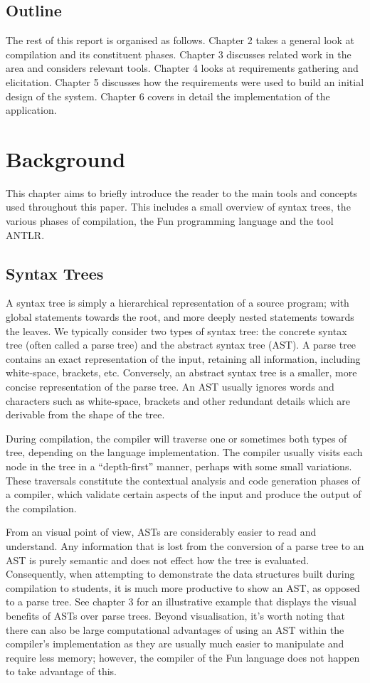 \documentclass{l4proj}
\begin{document}
\section{Outline}
The rest of this report is organised as follows. Chapter 2 takes a general look at compilation and its constituent phases. Chapter 3 discusses related work in the area and considers relevant tools. Chapter 4 looks at requirements gathering and elicitation. Chapter 5 discusses how the requirements were used to build an initial design of the system. Chapter 6 covers in detail the implementation of the application.

\chapter{Background}
This chapter aims to briefly introduce the reader to the main tools and concepts used throughout this paper. This includes a small overview of syntax trees, the various phases of compilation, the Fun programming language and the tool ANTLR.

\section{Syntax Trees}
A syntax tree is simply a hierarchical representation of a source program; with global statements towards the root, and more deeply nested statements towards the leaves. We typically consider two types of syntax tree: the concrete syntax tree (often called a parse tree) and the abstract syntax tree (AST). A parse tree contains an exact representation of the input, retaining all information, including white-space, brackets, etc. Conversely, an abstract syntax tree is a smaller, more concise representation of the parse tree. An AST usually ignores words and characters such as white-space, brackets and other redundant details which are derivable from the shape of the tree. 

During compilation, the compiler will traverse one or sometimes both types of tree, depending on the language implementation. The compiler usually visits each node in the tree in a ``depth-first'' manner, perhaps with some small variations. These traversals constitute the contextual analysis and code generation phases of a compiler, which validate certain aspects of the input and produce the output of the compilation. 

From an visual point of view, ASTs are considerably easier to read and understand. Any information that is lost from the conversion of a parse tree to an AST is purely semantic and does not effect how the tree is evaluated. Consequently, when attempting to demonstrate the data structures built during compilation to students, it is much more productive to show an AST, as opposed to a parse tree. See chapter 3 for an illustrative example that displays the visual benefits of ASTs over parse trees. Beyond visualisation, it's worth noting that there can  also be large computational advantages of using an AST within the compiler's implementation as they are usually much easier to manipulate and require less memory; however, the compiler of the Fun language does not happen to take advantage of this. 
\end{document}
